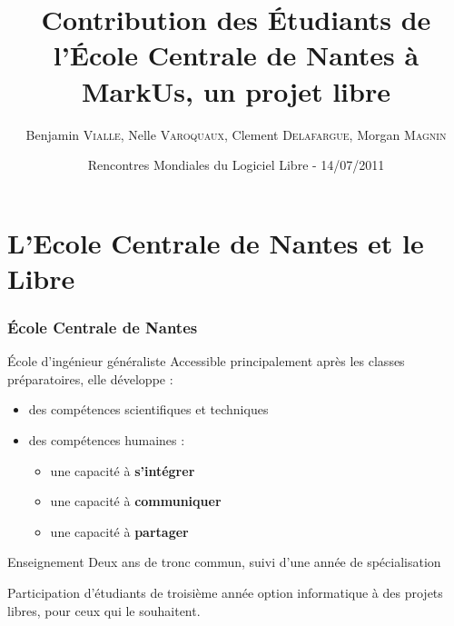\documentclass[svgnames,dvipsnames,usenames,handout]{beamer}        %
\title[]{Contribution des Étudiants de l’École Centrale de Nantes à MarkUs, un projet libre}
\subtitle{}
\author[B. \textsc{Vialle}, N. \textsc{Varoquaux}, C. \textsc{Delafargue}, M. \textsc{Magnin}]%
{Benjamin \textsc{Vialle}, Nelle \textsc{Varoquaux}, Clement \textsc{Delafargue}, Morgan \textsc{Magnin}}
\institute{École Centrale de Nantes}
\date{Rencontres Mondiales du Logiciel Libre - 14/07/2011} %
\begin{document}
\frame{\titlepage}


\section{L'Ecole Centrale de Nantes et le Libre}

\frame
{
  \frametitle{École Centrale de Nantes}

  \begin{block}{École d'ingénieur généraliste}
  Accessible principalement après les classes préparatoires, elle développe :
    \begin{itemize}[<+->]
      \item des compétences scientifiques et techniques
      \item des compétences humaines :
      \begin{itemize}
                \item une capacité à {\bf s'intégrer}
                \item une capacité à {\bf communiquer}
                \item une capacité à {\bf partager}
      \end{itemize}
    \end{itemize}
  \end{block}
  
  \begin{block}{Enseignement}
        Deux ans de tronc commun, suivi d'une année de spécialisation
  \end{block}
  
  \begin{alertblock}{}
    Participation d'étudiants de troisième année option informatique à des projets libres, pour ceux qui le souhaitent.
  \end{alertblock}
}
\end{document}

